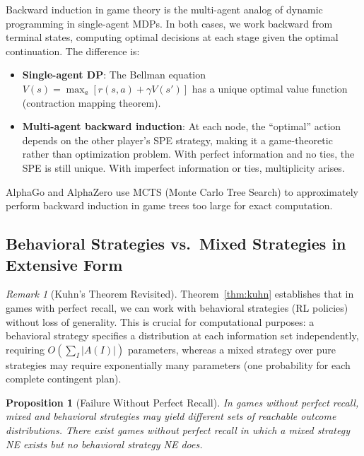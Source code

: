 \documentclass[11pt,a4paper]{article}
\theoremstyle{definition}
\theoremstyle{plain}
\newtheorem{proposition}[theorem]{Proposition}
\theoremstyle{remark}
\newtheorem{remark}{Remark}[section]
\begin{document}
\begin{rlconnection}
Backward induction in game theory is the multi-agent analog of dynamic programming in
single-agent MDPs. In both cases, we work backward from terminal states, computing
optimal decisions at each stage given the optimal continuation. The difference is:
\begin{itemize}[nosep]
    \item \textbf{Single-agent DP}: The Bellman equation $V(s) = \max_a [r(s,a) +
    \gamma V(s')]$ has a unique optimal value function (contraction mapping theorem).
    \item \textbf{Multi-agent backward induction}: At each node, the ``optimal''
    action depends on the other player's SPE strategy, making it a game-theoretic
    rather than optimization problem. With perfect information and no ties, the
    SPE is still unique. With imperfect information or ties, multiplicity arises.
\end{itemize}
AlphaGo and AlphaZero use MCTS (Monte Carlo Tree Search) to approximately perform
backward induction in game trees too large for exact computation.
\end{rlconnection}

\subsection{Behavioral Strategies vs.\ Mixed Strategies in Extensive Form}
\label{subsec:behavioral_vs_mixed}

\begin{remark}[Kuhn's Theorem Revisited]
\label{rem:kuhn_revisited}
Theorem~\ref{thm:kuhn} establishes that in games with perfect recall, we can work
with behavioral strategies (RL policies) without loss of generality. This is
crucial for computational purposes: a behavioral strategy specifies a distribution at
each information set independently, requiring $O(\sum_I |A(I)|)$ parameters, whereas
a mixed strategy over pure strategies may require exponentially many parameters
(one probability for each complete contingent plan).
\end{remark}

\begin{proposition}[Failure Without Perfect Recall]
\label{prop:no_perfect_recall}
In games without perfect recall, mixed and behavioral strategies may yield different
sets of reachable outcome distributions. There exist games without perfect recall
in which a mixed strategy NE exists but no behavioral strategy NE does.
\end{proposition}
\end{document}
